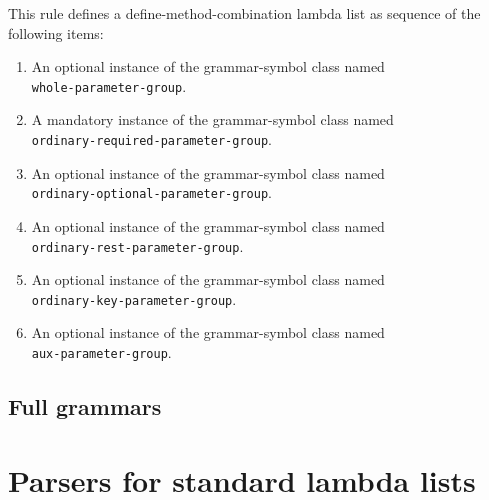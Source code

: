 This rule defines a define-method-combination lambda list as sequence
of the following items:

\begin{enumerate}
\item An optional instance of the grammar-symbol class named\\
  \texttt{whole-parameter-group}.
\item A mandatory instance of the grammar-symbol class named\\
  \texttt{ordinary-required-parameter-group}.
\item An optional instance of the grammar-symbol class named\\
  \texttt{ordinary-optional-parameter-group}.
\item An optional instance of the grammar-symbol class named\\
\texttt{ordinary-rest-parameter-group}.
\item An optional instance of the grammar-symbol class named\\
\texttt{ordinary-key-parameter-group}.
\item An optional instance of the grammar-symbol class named\\
\texttt{aux-parameter-group}.
\end{enumerate}



\subsection{Full grammars}










\section{Parsers for standard lambda lists}

